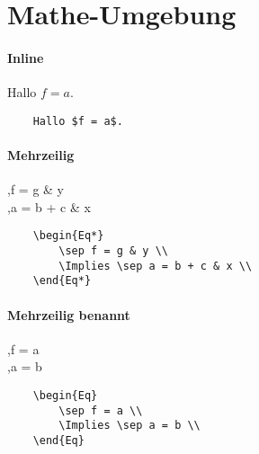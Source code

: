 \documentclass[]{article}
\begin{document}
\section{Mathe-Umgebung}

\paragraph{Inline}
Hallo $f = a$.
\begin{Verbatim}
	Hallo $f = a$.
\end{Verbatim}

\paragraph{Mehrzeilig}
\begin{Eq*}
	\sep f = g & y \\
	\Implies \sep a = b + c & x \\
\end{Eq*}
\begin{Verbatim}
	\begin{Eq*}
		\sep f = g & y \\
		\Implies \sep a = b + c & x \\
	\end{Eq*}
\end{Verbatim}

\paragraph{Mehrzeilig benannt}
\begin{Eq}
	\sep f = a \\
	\Implies \sep a = b \\
\end{Eq}
\begin{Verbatim}
	\begin{Eq}
		\sep f = a \\
		\Implies \sep a = b \\
	\end{Eq}
\end{Verbatim}
\end{document}
